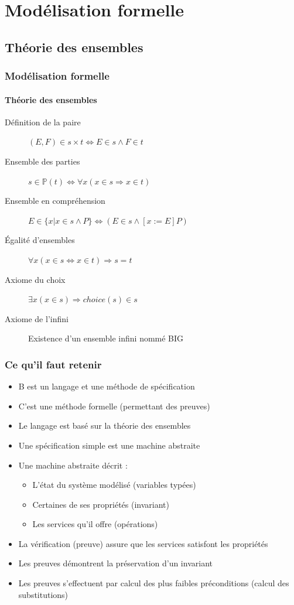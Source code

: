 \documentclass[11pt,a4paper,xcolor=table]{beamer} %
\begin{document}
%
%
\frame{\tableofcontents}

\section{Modélisation formelle}
\subsection{Théorie des ensembles}
\begin{frame}
\frametitle{Modélisation formelle}
\framesubtitle{Théorie des ensembles}
\begin{description}
\item[Définition de la paire] $(E, F) \in s \times t \Leftrightarrow E \in s \wedge F \in t$
\item[Ensemble des parties] $s \in \mathbb{P}(t) \Leftrightarrow \forall x (x \in s \Rightarrow x \in t)$
\item[Ensemble en compréhension] $E \in \{ x | x \in s \wedge P \} \Leftrightarrow (E \in s \wedge [x:= E] P)$
\item[Égalité d'ensembles] $\forall x (x \in s \Leftrightarrow x \in t) \Rightarrow s = t$
\item[Axiome du choix] $\exists x  (x \in s) \Rightarrow choice(s) \in s$
\item[Axiome de l'infini] Existence d'un ensemble infini nommé BIG
\end{description}
\end{frame}

\begin{frame}
\frametitle{Ce qu'il faut retenir}
\begin{itemize}
\item B est un langage et une méthode de spécification
\item C'est une méthode formelle (permettant des preuves)
\item Le langage est basé sur la théorie des ensembles
\item Une spécification simple est une machine abstraite
\item Une machine abstraite décrit :
\begin{itemize}
\item L'état du système modélisé (variables typées)
\item Certaines de ses propriétés (invariant)
\item Les services qu'il offre (opérations)
\end{itemize}
\item La vérification (preuve) assure que les services satisfont les
propriétés
\item Les preuves démontrent la préservation d'un invariant
\item Les preuves s'effectuent par calcul des plus faibles préconditions
(calcul des substitutions)
\end{itemize}
\end{frame}
\end{document}
